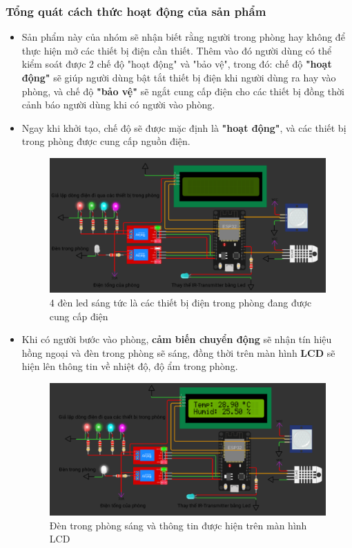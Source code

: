 \documentclass{report}
\begin{document}
\subsubsection{Tổng quát cách thức hoạt động của sản phẩm}
\begin{itemize}
    \item Sản phẩm này của nhóm sẽ nhận biết rằng người trong phòng hay không để thực hiện mở các thiết bị điện cần thiết. Thêm vào đó người dùng có thể kiểm soát được 2 chế độ "hoạt động" và "bảo vệ", trong đó: chế độ \textbf{"hoạt động"} sẽ giúp người dùng bật tắt thiết bị điện khi người dùng ra hay vào phòng, và chế độ \textbf{"bảo vệ"} sẽ ngắt cung cấp điện cho các thiết bị đồng thời cảnh báo người dùng khi có người vào phòng.

    \item Ngay khi khởi tạo, chế độ sẽ được mặc định là \textbf{"hoạt động"}, và các thiết bị trong phòng được cung cấp nguồn điện.

    \begin{figure}[!h]
        \centering
        \includegraphics[width=\textwidth, keepaspectratio]{img/Khoi_tao.png}
        \caption{4 đèn led sáng tức là các thiết bị điện trong phòng đang được cung cấp điện}
    \end{figure}

    \pagebreak
    \item Khi có người bước vào phòng, \textbf{cảm biến chuyển động} sẽ nhận tín hiệu hồng ngoại và đèn trong phòng sẽ sáng, đồng thời trên màn hình \textbf{LCD} sẽ hiện lên thông tin về nhiệt độ, độ ẩm trong phòng.

    \begin{figure}[!h]
        \centering
        \includegraphics[width=\textwidth, keepaspectratio]{img/vao_phong.png}
        \caption{Đèn trong phòng sáng và thông tin được hiện trên màn hình LCD}
    \end{figure}


\end{itemize}
\end{document}
